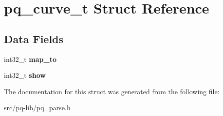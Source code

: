 \hypertarget{structpq__curve__t}{}\section{pq\+\_\+curve\+\_\+t Struct Reference}
\label{structpq__curve__t}
\subsection*{Data Fields}
\begin{DoxyCompactItemize}
\item 
\hypertarget{structpq__curve__t_a4b11a2aa62b427f241dbcde02a3a3075}{}int32\+\_\+t {\bfseries map\+\_\+to}\label{structpq__curve__t_a4b11a2aa62b427f241dbcde02a3a3075}

\item 
\hypertarget{structpq__curve__t_a857f26b666cf57e2885440db005182bd}{}int32\+\_\+t {\bfseries show}\label{structpq__curve__t_a857f26b666cf57e2885440db005182bd}

\end{DoxyCompactItemize}


The documentation for this struct was generated from the following file\+:\begin{DoxyCompactItemize}
\item 
src/pq-\/lib/pq\+\_\+parse.\+h\end{DoxyCompactItemize}

